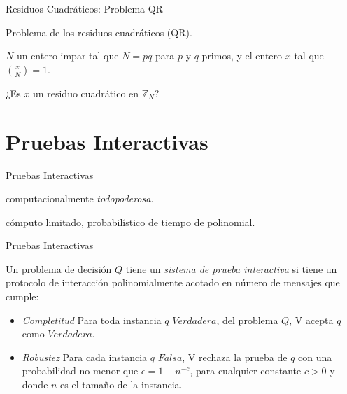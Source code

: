 \documentclass{beamer}
\begin{document}

\begin{frame}{Residuos Cuadráticos: Problema QR}
	\begin{description}[Parámetros]
		\item[Nombre] Problema de los residuos cuadr\'aticos (QR).
		\item[Parámetros] $N$ un entero impar tal que $N = pq$ para $p$ y $q$ primos, y el entero $x$ tal que $\left( \frac{x}{N} \right) = 1$.
		\item[Pregunta] ¿Es $x$ un residuo cuadrático en ${\mathbb Z}_N$?
	\end{description}
\end{frame}


\section{Pruebas Interactivas}

\begin{frame}{Pruebas Interactivas}

\begin{description}[Q]
	\item[Probador (P)] computacionalmente \textit{todopoderosa}.
	\item[Verificador (V)] cómputo limitado, probabilístico de tiempo de polinomial.
\end{description}

\end{frame}

\begin{frame}{Pruebas Interactivas}
	\begin{definition}
		
		Un problema de decisión $Q$ tiene un \textit{sistema de prueba interactiva} si tiene un protocolo de interacción polinomialmente acotado en número de mensajes que cumple:
		
		\begin{itemize}
			\item \textit{Completitud} Para toda instancia $q$ $Verdadera$, del problema $Q$, V acepta $q$ como $Verdadera$.
			\item \textit{Robustez} Para cada instancia $q$ $Falsa$, V rechaza la prueba de $q$ con una probabilidad no menor que $\epsilon = 1-n^{-c}$, para cualquier constante $c>0$ y donde $n$ es el tamaño de la instancia.
		\end{itemize}
		
	\end{definition}
\end{frame}
\end{document}

